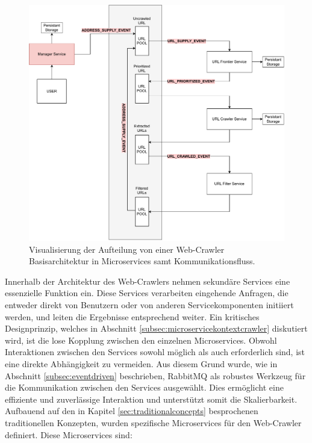 \begin{figure}[H]
    \centering
    \includegraphics[width=14cm]{images/40_concept/microservice_conception.pdf}
    \caption[Visualisierung Web-Crawler Basisarchitektur]{Visualisierung der Aufteilung von einer Web-Crawler Basisarchitektur in Microservices samt Kommunikationsfluss.}
    \label{fig:architecture}
\end{figure}

Innerhalb der Architektur des Web-Crawlers nehmen sekundäre Services eine essenzielle Funktion ein. Diese Services verarbeiten eingehende Anfragen, die entweder direkt von Benutzern oder von anderen Servicekomponenten initiiert werden, und leiten die Ergebnisse entsprechend weiter. Ein kritisches Designprinzip, welches in Abschnitt \ref{subsec:microservicekontextcrawler} diskutiert wird, ist die lose Kopplung zwischen den einzelnen Microservices. Obwohl Interaktionen zwischen den Services sowohl möglich als auch erforderlich sind, ist eine direkte Abhängigkeit zu vermeiden. Aus diesem Grund wurde, wie in Abschnitt \ref{subsec:eventdriven} beschrieben, RabbitMQ als robustes Werkzeug für die Kommunikation zwischen den Services ausgewählt. Dies ermöglicht eine effiziente und zuverlässige Interaktion und unterstützt somit die Skalierbarkeit.
\newpage
Aufbauend auf den in Kapitel \ref{sec:traditionalconcepts} besprochenen traditionellen Konzepten, wurden spezifische Microservices für den Web-Crawler definiert. Diese Microservices sind:

